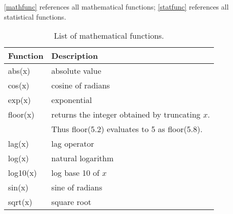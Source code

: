 \autoref{mathfunc} references all mathematical functions;
\autoref{statfunc} references all statistical functions.
  
 
 
   


\begin{table}[ht]
\begin{center}
\begin{tabular}{|l|l|}
\hline
{\bf Function} & {\bf Description} \\
\hline \hline
abs(x) & absolute value \\
cos(x) & cosine of radians \\
exp(x) & exponential \\
floor(x) & returns the integer obtained by truncating $x$. \\
& Thus floor(5.2) evaluates to 5 as floor(5.8). \\
lag(x) & lag operator \\
log(x) & natural logarithm \\
log10(x) & log base 10 of $x$ \\
sin(x) & sine of radians \\
sqrt(x) & square root \\
\hline
\end{tabular}
{\em\caption{\label{mathfunc} List of mathematical functions.}}
\end{center}
\end{table}




